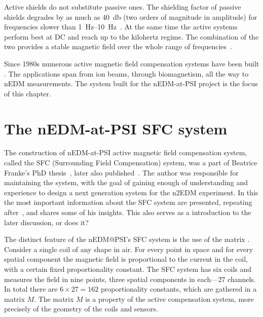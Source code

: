 Active shields do not substitute passive ones. The shielding factor
 of passive shields degrades by as much as \SI{40}{\decibel} (two orders of magnitude in amplitude) for frequencies slower than \SIrange[range-phrase = --]{1}{10}{\hertz}~\cite{Brake1991}. At the same time the active systems perform best at DC and reach up to the kilohertz regime. The combination of the two provides a stable magnetic field over the whole range of frequencies~\cite{Brake1991,Kelha1982,Voigt2013}.

Since 1980s numerous active magnetic field compensation systems have been built \cite{Kelha1982,Brake1991,Spemann2003,Brys2005,Kobayashi2012,Voigt2013,Afach2014}. The applications span from ion beams, through biomagnetism, all the way to nEDM measurements. The system built for the nEDM-at-PSI project is the focus of this chapter.




\section{The nEDM-at-PSI SFC system}
The construction of nEDM-at-PSI active magnetic field compensation system, called the SFC (Surrounding Field Compensation) system,
was a part of Beatrice Franke's PhD thesis~\cite{Franke2013}, later also published~\cite{Afach2014}. The author was responsible for maintaining the system, with the goal of gaining enough of understanding and experience to design a next generation system for the n2EDM experiment. In this the most important information about the SFC system are presented, repeating after~\cite{Franke2013}, and shares some of his insights. This also serves as a introduction to the later discussion, or does it?

The distinct feature of the nEDM@PSI's SFC system is the use of the matrix . Consider a single coil of any shape in air. For every point in space and for every spatial component the magnetic field is proportional to the current in the coil, with a certain fixed proportionality constant. The SFC system has six coils and measures the field in nine points, three spatial components in each---27 channels. In total there are $6 \times 27 = 162$ proportionality constants, which are gathered in a matrix $M$. The matrix $M$ is a property of the active compensation system, more precisely of the geometry of the coils and sensors. 

